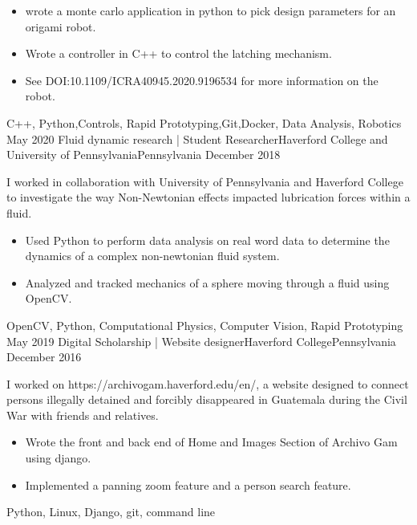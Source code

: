 \begin{experiences}
{\begin{itemize}
			\item wrote a monte carlo application in python to pick design parameters for an origami robot.
			\item Wrote a controller in C++ to control the latching mechanism.
			\item  See DOI:10.1109/ICRA40945.2020.9196534 for more information on the robot.
                      \end{itemize}
                    }
                    {C++, Python,Controls, Rapid Prototyping,Git,Docker, Data Analysis, Robotics}
  \experience
    {May 2020}   {Fluid dynamic research | Student Researcher}{Haverford College and University of Pennsylvania}{Pennsylvania}
    {December 2018} {
  I worked in collaboration with University of Pennsylvania and Haverford College to investigate the way Non-Newtonian effects impacted lubrication forces within a fluid.
                      \begin{itemize}
                        \item  Used Python to perform data analysis on real word data to determine the dynamics of a complex non-newtonian fluid system.
                         \item Analyzed and tracked mechanics of a sphere moving through a fluid using OpenCV.
                      \end{itemize}
                    }
                    {OpenCV, Python, Computational Physics, Computer Vision, Rapid Prototyping}
  \experience
    {May 2019}   {Digital Scholarship | Website designer}{Haverford College}{Pennsylvania}
    {December 2016} {
    I worked on https://archivogam.haverford.edu/en/, a website designed to connect persons illegally detained and forcibly disappeared in Guatemala during the Civil War with friends and relatives.
                      \begin{itemize}
                       \item Wrote the front and back end of Home and Images Section of Archivo Gam using django.
		     \item Implemented a panning zoom feature and a person search feature.
                      \end{itemize}
                    }
                    {Python, Linux, Django, git, command line }

 
 

\end{experiences}
